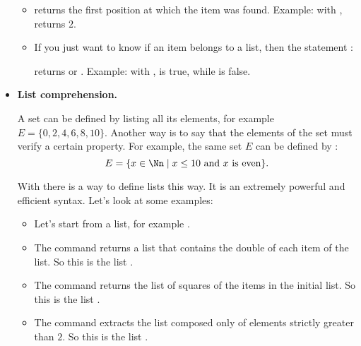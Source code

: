 \documentclass[11pt,class=report,crop=false]{standalone}
\begin{document}
\begin{cours}
\begin{itemize}
\begin{itemize}

    \item {}
    returns the first position at which the item was found. Example: with ,
    returns $2$.

  \item {} 
  If you just want to know if an item belongs to a list, then the statement :
  
  returns  or .
  Example: with ,
   \og{}\fg{} is true, while \og{}\fg{} is false.
  
\end{itemize}
   
  \item \textbf{List comprehension.}
  
  
  A set can be defined by listing all its elements, for example $E = \{0,2,4,6,8,10\}$. Another way is to say that the elements of the set must verify a certain property. For example, the same set $E$ can be defined by :
  $$E = \{ x \in \Nn \mid x \le 10 \text{ and } x \text{ is even} \}.$$
  
  With \Python{} there is a way to define lists this way. It is an extremely powerful and efficient syntax. Let's look at some examples:
  \begin{itemize}
    \item Let's start from a list, for example .
    
    \item The command  returns a list that contains the double of each item of the  list. So this is the list \ci{[2,4,6,8,...]}.
    
    \item The command  returns the list of squares of the items in the initial list. So this is the list \ci{[1,4,9,16,...]}.
    
    \item The command 
    extracts the list composed only of elements strictly greater than $2$. So this is the list \ci{[3,4,5,6,7,6,5,4,3]}.
	\end{itemize}
	

\end{itemize}
\end{cours}
\end{document}

